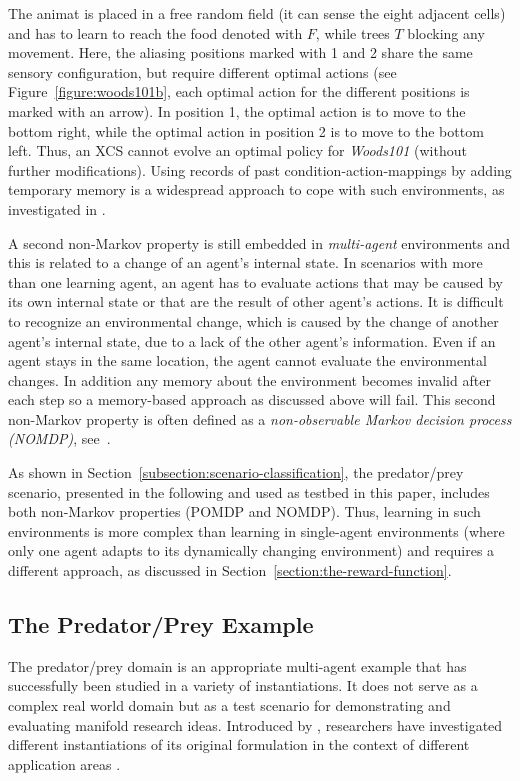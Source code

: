 The animat is placed in a free random field (it can sense the eight adjacent cells) and has to learn to reach the food denoted with $F$, while trees $T$ blocking any movement. Here, the aliasing positions marked with 1 and 2 share the same sensory configuration, but require different optimal actions (see Figure~\ref{figure:woods101b}, each optimal action for the different positions is marked with an arrow). In position 1, the optimal action is to move to the bottom right, while the optimal action in position 2 is to move to the bottom left. Thus, an XCS cannot evolve an optimal policy for \emph{Woods101} (without further modifications). 
Using records of past condition-action-mappings by adding temporary memory is a widespread approach to cope with such environments, as investigated in \cite{Lan98,LW00}.

A second non-Markov property is still embedded in \emph{multi-agent} environments and this is related to a change of an agent's internal state. In scenarios with more than one learning agent, an agent has to evaluate actions that may be caused by its own internal state or that are the result of other agent's actions. It is difficult to recognize an environmental change, which is caused by the change of another agent's internal state, due to a lack of the other agent's information. Even if an agent stays in the same location, the agent cannot evaluate the environmental changes.
In addition any memory about the environment becomes invalid after each step so a memory-based approach as discussed above will fail. 
This second non-Markov property is often defined as a \emph{non-observable Markov decision process (NOMDP)}, see~\cite{TTS01}.

As shown in Section~\ref{subsection:scenario-classification}, the predator/prey scenario, presented in the following and used as testbed in this paper, includes both non-Markov properties (POMDP and NOMDP). Thus, learning in such environments is more complex than learning in single-agent environments (where only one agent adapts to its dynamically changing environment) and requires a different approach, as discussed in Section~\ref{section:the-reward-function}.

\subsection{The Predator/Prey Example}
\label{section:the-predator-prey-example}

The predator/prey domain is an appropriate multi-agent example that has successfully been studied in a variety of instantiations. It does not serve as a complex real world domain but as a test scenario for demonstrating and evaluating manifold research ideas. Introduced by \cite{BJD86}, researchers have investigated different instantiations of its original formulation in the context of different application areas \cite{SV00}. 

